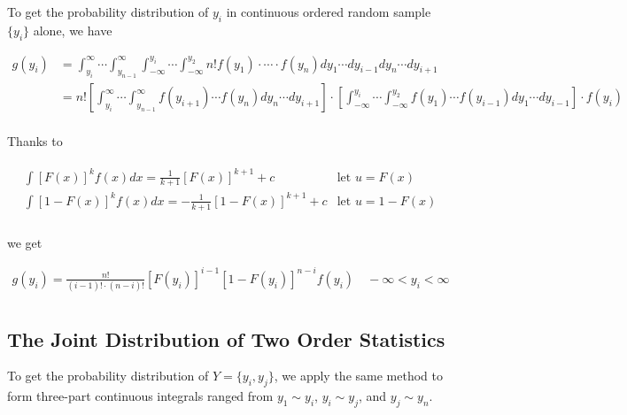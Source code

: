 \begin{proposition}
    To get the probability distribution of $y_i$ in continuous ordered random sample $\{y_i\}$ alone, we have 

    \begin{align*}
        g(y_i) & = \int_{y_i}^\infty\cdots\int_{y_{n-1}}^\infty\int_{-\infty}^{y_i}\cdots\int_{-\infty}^{y_2} n!f(y_1)\cdot\cdots\cdot f(y_n) dy_1\cdots dy_{i-1}dy_n\cdots dy_{i+1} \\
        & = n!\left[\int_{y_i}^\infty\cdots\int_{y_{n-1}}^\infty f(y_{i+1})\cdots f(y_n) dy_n\cdots dy_{i+1}\right]\cdot\left[\int_{-\infty}^{y_i}\cdots\int_{-\infty}^{y_2} f(y_1)\cdots f(y_{i-1}) dy_1\cdots dy_{i-1}\right]\cdot f(y_i) \\
    \end{align*}

    Thanks to 

    \begin{align*}
        \begin{array}{ll}
            \int [F(x)]^kf(x)dx = \frac{1}{k+1}[F(x)]^{k+1}+c & \text{let }u=F(x) \\
            \int [1-F(x)]^kf(x)dx = -\frac{1}{k+1}[1-F(x)]^{k+1}+c & \text{let }u=1-F(x) \\
        \end{array}
    \end{align*}

    we get 

    \begin{align*}
        g(y_i) = \frac{n!}{(i-1)!\cdot(n-i)!}[F(y_i)]^{i-1}[1-F(y_i)]^{n-i}f(y_i)\quad -\infty<y_i<\infty \\
    \end{align*}
\end{proposition}

\subsection{The Joint Distribution of Two Order Statistics}

To get the probability distribution of $Y=\{y_i,y_j\}$, we apply the same method to form three-part continuous integrals ranged from $y_1\sim y_{i}$, $y_{i}\sim y_{j}$, and $y_{j}\sim y_n$.
